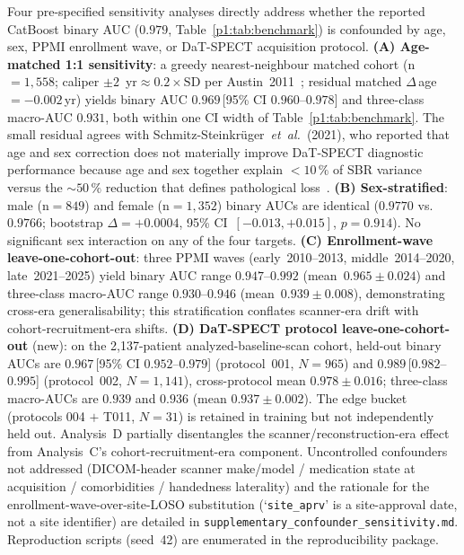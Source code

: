 Four pre-specified sensitivity analyses directly address whether the reported CatBoost binary AUC ($0.979$, Table~\ref{p1:tab:benchmark}) is confounded by age, sex, PPMI enrollment wave, or DaT-SPECT acquisition protocol. \textbf{(A) Age-matched 1:1 sensitivity}: a greedy nearest-neighbour matched cohort (n${=}1{,}558$; caliper $\pm 2$~yr${\approx}0.2{\times}\mathrm{SD}$ per Austin~2011~\cite{austin2011caliper}; residual matched $\Delta$\,age${=}{-}0.002$\,yr) yields binary AUC $0.969$\,[95\% CI $0.960$--$0.978$] and three-class macro-AUC $0.931$, both within one CI width of Table~\ref{p1:tab:benchmark}. The small residual agrees with Schmitz-Steinkr\"{u}ger~\emph{et~al.}~(2021), who reported that age and sex correction does not materially improve DaT-SPECT diagnostic performance because age and sex together explain $<\!10\,\%$ of SBR variance versus the ${\sim}50\,\%$ reduction that defines pathological loss~\cite{schmitzSteinkruger2021age}. \textbf{(B) Sex-stratified}: male (n${=}849$) and female (n${=}1{,}352$) binary AUCs are identical ($0.9770$ vs.\ $0.9766$; bootstrap $\Delta{=}{+}0.0004$, 95\% CI~$[-0.013, +0.015]$, $p{=}0.914$). No significant sex interaction on any of the four targets. \textbf{(C) Enrollment-wave leave-one-cohort-out}: three PPMI waves (early~2010--2013, middle~2014--2020, late~2021--2025) yield binary AUC range $0.947$--$0.992$ (mean~$0.965 \pm 0.024$) and three-class macro-AUC range $0.930$--$0.946$ (mean~$0.939 \pm 0.008$), demonstrating cross-era generalisability; this stratification conflates scanner-era drift with cohort-recruitment-era shifts. \textbf{(D) DaT-SPECT protocol leave-one-cohort-out} (new): on the 2,137-patient analyzed-baseline-scan cohort, held-out binary AUCs are $0.967$\,[95\% CI $0.952$--$0.979$] (protocol~001, $N{=}965$) and $0.989$\,[$0.982$--$0.995$] (protocol~002, $N{=}1{,}141$), cross-protocol mean $0.978 \pm 0.016$; three-class macro-AUCs are $0.939$ and $0.936$ (mean $0.937 \pm 0.002$). The edge bucket (protocols 004 $+$ T011, $N{=}31$) is retained in training but not independently held out. Analysis~D partially disentangles the scanner/reconstruction-era effect from Analysis~C's cohort-recruitment-era component. Uncontrolled confounders not addressed (DICOM-header scanner make/model / medication state at acquisition / comorbidities / handedness laterality) and the rationale for the enrollment-wave-over-site-LOSO substitution (`\texttt{site\_aprv}' is a site-approval date, not a site identifier) are detailed in \texttt{supplementary\_confounder\_sensitivity.md}. Reproduction scripts (seed~42) are enumerated in the reproducibility package.
